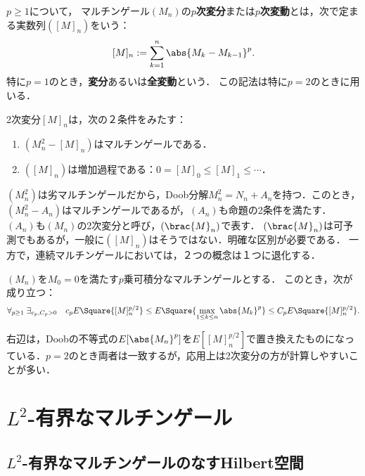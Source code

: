 \documentclass[uplatex,dvipdfmx]{jsreport}
\begin{document}
\begin{definition}
    $p\ge 1$について，
    マルチンゲール$(M_n)$の\textbf{$p$次変分}または\textbf{$p$次変動}とは，次で定まる実数列$([M]_n)$をいう：
    \[[M]_n:=\sum^n_{k=1}\abs{M_k-M_{k-1}}^p.\]
    特に$p=1$のとき，\textbf{変分}あるいは\textbf{全変動}という．
    この記法は特に$p=2$のときに用いる．
\end{definition}

\begin{proposition}
    2次変分$[M]_n$は，次の２条件をみたす：
    \begin{enumerate}
        \item $(M_n^2-[M]_n)$はマルチンゲールである．
        \item $([M]_n)$は増加過程である：$0=[M]_0\le[M]_1\le\cdots$．
    \end{enumerate}
\end{proposition}

\begin{remark}
    $(M^2_n)$は劣マルチンゲールだから，Doob分解$M_n^2=N_n+A_n$を持つ．このとき，$(M_n^2-A_n)$はマルチンゲールであるが，$(A_n)$も命題の2条件を満たす．
    $(A_n)$も$(M_n)$の2次変分と呼び，$(\brac{M}_n)$で表す．
    $(\brac{M}_n)$は可予測でもあるが，一般に$([M]_n)$はそうではない．明確な区別が必要である．
    一方で，連続マルチンゲールにおいては，２つの概念は１つに退化する．
\end{remark}

\begin{theorem}
    $(M_n)$を$M_0=0$を満たす$p$乗可積分なマルチンゲールとする．
    このとき，次が成り立つ：
    \[\forall_{p\ge 1}\;\exists_{c_p,C_p>0}\quad c_pE\Square{[M]^{p/2}_n}\le E\Square{\max_{1\le k\le n}\abs{M_k}^p}\le C_pE\Square{[M]^{p/2}_n}.\]
\end{theorem}
\begin{remarks}
    右辺は，Doobの不等式の$E[\abs{M_n}^p]$を$E[[M]_n^{p/2}]$で置き換えたものになっている．$p=2$のとき両者は一致するが，応用上は2次変分の方が計算しやすいことが多い．
\end{remarks}

\section{$L^2$-有界なマルチンゲール}

\subsection{$L^2$-有界なマルチンゲールのなすHilbert空間}
\end{document}
